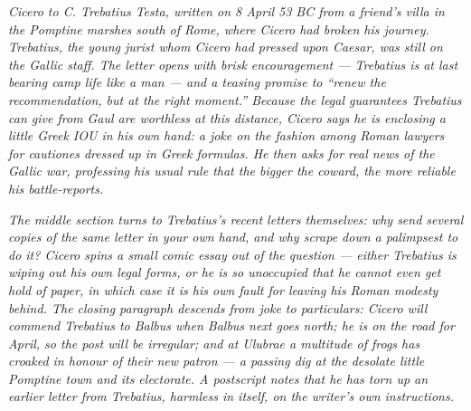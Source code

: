 
\textit{Cicero to C. Trebatius Testa, written on 8 April 53 BC
from a friend's villa in the Pomptine marshes south of Rome,
where Cicero had broken his journey. Trebatius, the young jurist
whom Cicero had pressed upon Caesar, was still on the Gallic
staff. The letter opens with brisk encouragement --- Trebatius is
at last bearing camp life like a man --- and a teasing promise to
``renew the recommendation, but at the right moment.'' Because
the legal guarantees Trebatius can give from Gaul are worthless
at this distance, Cicero says he is enclosing a little Greek IOU
in his own hand: a joke on the fashion among Roman lawyers for
\textit{cautiones} dressed up in Greek formulas. He then asks
for real news of the Gallic war, professing his usual rule that
the bigger the coward, the more reliable his battle-reports.}

\textit{The middle section turns to Trebatius's recent letters
themselves: why send several copies of the same letter in your
own hand, and why scrape down a palimpsest to do it? Cicero
spins a small comic essay out of the question --- either Trebatius
is wiping out his own legal forms, or he is so unoccupied that
he cannot even get hold of paper, in which case it is his own
fault for leaving his Roman modesty behind. The closing
paragraph descends from joke to particulars: Cicero will commend
Trebatius to Balbus when Balbus next goes north; he is on the
road for April, so the post will be irregular; and at Ulubrae a
multitude of frogs has croaked in honour of their new patron ---
a passing dig at the desolate little Pomptine town and its
electorate. A postscript notes that he has torn up an earlier
letter from Trebatius, harmless in itself, on the writer's own
instructions.}

